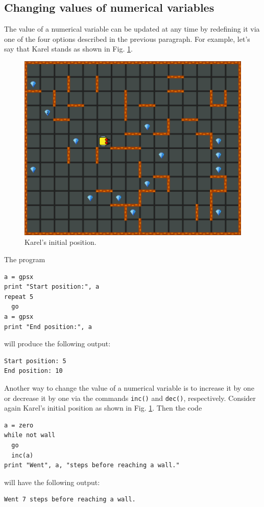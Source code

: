 \documentclass[article,A4,12pt]{llncs}
\begin{document}
{{{{\subsection{Changing values of numerical variables}

The value of a numerical variable can be updated at any time by redefining it via 
one of the four options described in the previous paragraph. For example, let's say that 
Karel stands as shown in Fig. \ref{fig:var1}.
\begin{figure}[!ht]
\begin{center}
\includegraphics[height=0.4\textwidth]{img/variables1.png}
\end{center}
\vspace{-4mm}
\caption{Karel's initial position.}
\label{fig:var1}
\end{figure}
\noindent
The program

\begin{verbatim}
a = gpsx
print "Start position:", a
repeat 5
  go
a = gpsx 
print "End position:", a
\end{verbatim}
will produce the following output:

\begin{verbatim}
Start position: 5
End position: 10
\end{verbatim}
Another way to change the value of a numerical variable is to increase it by one or 
decrease it by one via the commands {\tt inc()} and 
{\tt dec()}, respectively. Consider again Karel's initial position as shown 
in Fig. \ref{fig:var1}. Then the code

\begin{verbatim}
a = zero
while not wall
  go
  inc(a)
print "Went", a, "steps before reaching a wall."
\end{verbatim}
will have the following output:

\begin{verbatim}
Went 7 steps before reaching a wall.
\end{verbatim}

}}}}
\end{document}
